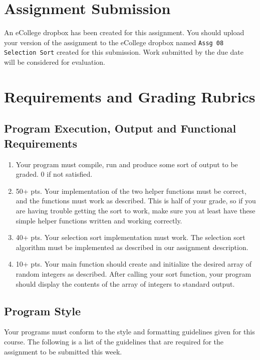 \documentclass[11pt]{article}
\begin{document}
\section*{Assignment Submission}
\label{sec-4}


An eCollege dropbox has been created for this assignment.  You should
upload your version of the assignment to the eCollege dropbox named
\verb~Assg 08 Selection Sort~ created for this submission.  Work
submitted by the due date will be considered for evaluation.
\section*{Requirements and Grading Rubrics}
\label{sec-5}
\subsection*{Program Execution, Output and Functional Requirements}
\label{sec-5-1}


\begin{enumerate}
\item Your program must compile, run and produce some sort of output to
   be graded. 0 if not satisfied.
\item 50+ pts.  Your implementation of the two helper functions must be
   correct, and the functions must work as described.  This is half of
   your grade, so if you are having trouble getting the sort to work,
   make sure you at least have these simple helper functions written
   and working correctly.
\item 40+ pts. Your selection sort implementation must work.  The
   selection sort algorithm must be implemented as described in our
   assignment description.
\item 10+ pts. Your main function should create and initialize the
   desired array of random integers as described.  After calling your
   sort function, your program should display the contents of the
   array of integers to standard output.
\end{enumerate}
\subsection*{Program Style}
\label{sec-5-2}


Your programs must conform to the style and formatting guidelines
given for this course.  The following is a list of the guidelines that
are required for the assignment to be submitted this week.
\end{document}
